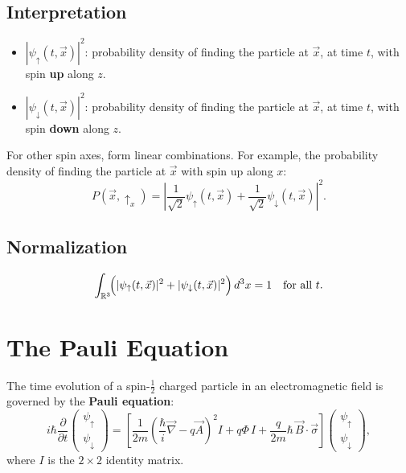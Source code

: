 \documentclass[11pt,a4paper]{article}
\theoremstyle{definition}
\theoremstyle{plain}
\theoremstyle{remark}
\begin{document}
\subsection{Interpretation}

\begin{itemize}
    \item $|\psi_\uparrow(t, \vec{x})|^2$: probability density of finding the particle at $\vec{x}$, at time $t$, with spin \textbf{up} along $z$.
    \item $|\psi_\downarrow(t, \vec{x})|^2$: probability density of finding the particle at $\vec{x}$, at time $t$, with spin \textbf{down} along $z$.
\end{itemize}

For other spin axes, form linear combinations. For example, the probability density of finding the particle at $\vec{x}$ with spin up along $x$:
\[
    P(\vec{x}, \uparrow_x) = \left|\frac{1}{\sqrt{2}}\psi_\uparrow(t, \vec{x}) + \frac{1}{\sqrt{2}}\psi_\downarrow(t, \vec{x})\right|^2.
\]

\subsection{Normalization}

\[
    \int_{\mathbb{R}^3}\!\Bigl(|\psi_\uparrow(t, \vec{x})|^2 + |\psi_\downarrow(t, \vec{x})|^2\Bigr)\,d^3x = 1 \quad \text{for all } t.
\]

\section{The Pauli Equation}

The time evolution of a spin-$\frac{1}{2}$ charged particle in an electromagnetic field is governed by the \textbf{Pauli equation}:
\[
    \boxed{i\hbar\frac{\partial}{\partial t}\begin{pmatrix}\psi_\uparrow \\ \psi_\downarrow\end{pmatrix} = \left[\frac{1}{2m}\!\left(\frac{\hbar}{i}\vec{\nabla} - q\vec{A}\right)^{\!2} I + q\Phi\, I + \frac{q}{2m}\hbar\,\vec{B}\cdot\vec{\sigma}\right]\begin{pmatrix}\psi_\uparrow \\ \psi_\downarrow\end{pmatrix},}
\]
where $I$ is the $2 \times 2$ identity matrix.
\end{document}
